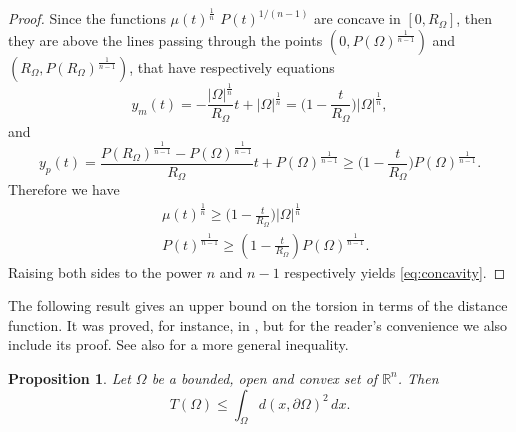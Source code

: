\documentclass[oneside,a4paper,11pt,notitlepage]{article}
\newcommand{\abs}[1]{{\left|#1\right|}}
\theoremstyle{definition}
\theoremstyle{plain}
\newtheorem{prop}[teorema]{Proposition}
\theoremstyle{definition}
\begin{document}
\begin{proof}
Since the functions $\mu(t)^{\frac{1}{n}}$  $P(t)^{1/(n-1)}$ are concave in $[0,R_\Omega]$, then they are above the lines passing through the points $(0,P(\Omega)^{\frac{1}{n-1}})$ and $(R_\Omega, P(R_\Omega)^{\frac{1}{n-1}})$, that have respectively equations
\begin{equation*}
    y_m(t) = -\frac{\abs{\Omega}^{\frac{1}{n}}}{R_\Omega}t+\abs{\Omega}^{\frac{1}{n}}= \bigg(1-\frac{t}{R_\Omega}\bigg)\abs{\Omega}^{\frac{1}{n}},
\end{equation*}
and
\begin{equation*}
    y_p(t) = \frac{P(R_\Omega)^{\frac{1}{n-1}}-P(\Omega)^{\frac{1}{n-1}}}{R_\Omega}t+P(\Omega)^{\frac{1}{n-1}}\ge \bigg(1-\frac{t}{R_\Omega}\bigg)P(\Omega)^{\frac{1}{n-1}}.
\end{equation*}
Therefore we have
\begin{align*}
&\mu(t)^{\frac1n}\ge \bigg(1-\frac{t}{R_\Omega}\bigg)\abs{\Omega}^{\frac{1}{n}}\\
&P(t)^{\frac{1}{n-1}}
\ge
\left(1-\frac{t}{R_\Omega}\right) P(\Omega)^{\frac{1}{n-1}}.
\end{align*}
Raising both sides to the power $n$ and $n-1$ respectively yields \eqref{eq:concavity}.
\end{proof}
The following result gives an upper bound on the torsion in terms of the distance function. It was proved, for instance, in \cite{Cra2004}, but for the reader’s convenience we also include its proof. See also \cite{prinari2023sharp} for a more general inequality.
\begin{prop}
\label{prop:TlessD}
    Let $\Omega$ be a bounded, open and convex set of $\mathbb{R}^n$. Then
    \begin{equation}\label{eq:torsiondistancefunction}
        T(\Omega)\le \int_{\Omega}d(x,\partial\Omega)^2\,dx.
    \end{equation}
\end{prop}
\end{document}
